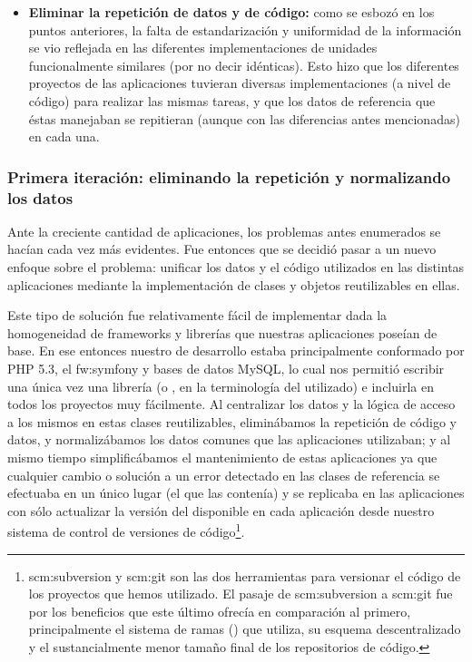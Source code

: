 \begin{itemize}
  \item \textbf{Eliminar la repetición de datos y de código:} como se esbozó en los puntos anteriores, la falta de estandarización y uniformidad de la información se vio reflejada en las diferentes implementaciones de unidades funcionalmente similares (por no decir idénticas). Esto hizo que los diferentes proyectos de las aplicaciones tuvieran diversas implementaciones (a nivel de código) para realizar las mismas tareas, y que los datos de referencia que éstas manejaban se repitieran (aunque con las diferencias antes mencionadas) en cada una.
\end{itemize}


\subsubsection{Primera iteración: eliminando la repetición y normalizando los datos}
\label{nube:etapa1}

Ante la creciente cantidad de aplicaciones, los problemas antes enumerados se hacían cada vez más evidentes. Fue entonces que se decidió pasar a un nuevo enfoque sobre el problema: unificar los datos y el código utilizados en las distintas aplicaciones mediante la implementación de clases y objetos reutilizables en ellas.

Este tipo de solución fue relativamente fácil de implementar dada la homogeneidad de frameworks y librerías que nuestras aplicaciones poseían de base. En ese entonces nuestro  de desarrollo estaba principalmente conformado por PHP 5.3, el  \gls{fw:symfony} y bases de datos MySQL, lo cual nos permitió escribir una única vez una librería (o , en la terminología del  utilizado) e incluirla en todos los proyectos muy fácilmente. Al centralizar los datos y la lógica de acceso a los mismos en estas clases reutilizables, eliminábamos la repetición de código y datos, y normalizábamos los datos comunes que las aplicaciones utilizaban; y al mismo tiempo simplificábamos el mantenimiento de estas aplicaciones ya que cualquier cambio o solución a un error detectado en las clases de referencia se efectuaba en un único lugar (el  que las contenía) y se replicaba en las aplicaciones con sólo actualizar la versión del  disponible en cada aplicación desde nuestro sistema de control de versiones de código\footnote{\gls{scm:subversion} y \gls{scm:git} son las dos herramientas para versionar el código de los proyectos que hemos utilizado. El pasaje de \gls{scm:subversion} a \gls{scm:git} fue por los beneficios que este último ofrecía en comparación al primero, principalmente el sistema de ramas () que utiliza, su esquema descentralizado y el sustancialmente menor tamaño final de los repositorios de código.}.

